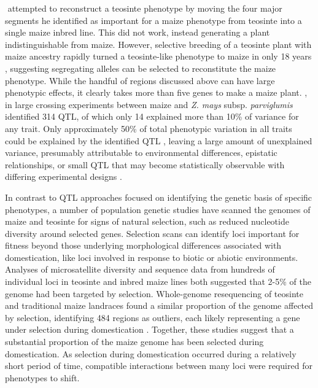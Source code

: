 \documentclass[a4paper]{article}
\begin{document}
﻿\citet{mangelsdorf1974} attempted to reconstruct a teosinte phenotype by moving the four major segments he identified as important for a maize phenotype from teosinte into a single maize inbred line.
﻿This did not work, instead generating a plant indistinguishable from maize.
However, selective breeding of a teosinte plant with maize ancestry rapidly turned a teosinte-like phenotype to maize in only 18 years \citep{weatherwax1924, collins1925}, suggesting segregating alleles can be selected to reconstitute the maize phenotype.
﻿While the handful of regions discussed above can have large phenotypic effects, it clearly takes more than five genes to make a maize plant.
\citet{briggs2007}, in large crossing experiments between maize and \textit{Z. mays} subsp. \textit{parviglumis} identified 314 QTL, of which only 14 explained more than 10\% of variance for any trait.
﻿Only approximately 50\% of total phenotypic variation in all traits could be explained by the identified QTL \citep{briggs2007}, leaving a large amount of unexplained variance, presumably attributable to environmental differences, epistatic relationships, or small QTL that may become statistically observable with differing experimental designs \citep{yu2008}.

﻿In contrast to QTL approaches focused on identifying the genetic basis of specific phenotypes, a number of population genetic studies have scanned the genomes of maize and teosinte for signs of natural selection, such as reduced nucleotide diversity around selected genes.
﻿Selection scans can identify loci important for fitness beyond those underlying morphological differences associated with domestication, like loci involved in response to biotic or abiotic environments.
Analyses of microsatellite diversity \citep{vigouroux2002, vigouroux2005} and sequence data from hundreds of individual loci in teosinte and inbred maize lines \citep{wright2005} both suggested that 2-5\% of the genome had been targeted by selection.
﻿Whole-genome resequencing of teosinte and traditional maize landraces found a similar proportion of the genome affected by selection, identifying 484 regions as outliers, each likely representing a gene under selection during domestication \citep{hufford2012natgen}.
﻿Together, these studies suggest that a substantial proportion of the maize genome has been selected during domestication.
﻿As selection during domestication occurred during a relatively short period of time, compatible interactions between many loci were required for phenotypes to shift.
\end{document}
